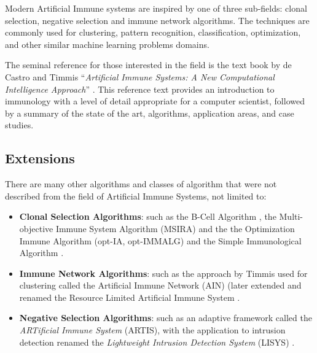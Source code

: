 \begin{bibunit}
Modern Artificial Immune systems are inspired by one of three sub-fields: clonal selection, negative selection and immune network algorithms. The techniques are commonly used for clustering, pattern recognition, classification, optimization, and other similar machine learning problems domains.

The seminal reference for those interested in the field is the text book by de Castro and Timmis ``\emph{Artificial Immune Systems: A New Computational Intelligence Approach}'' \cite{Castro2002}. This reference text provides an introduction to immunology with a level of detail appropriate for a computer scientist, followed by a summary of the state of the art, algorithms, application areas, and case studies.

% 
% 
\subsection{Extensions}
There are many other algorithms and classes of algorithm that were not described from the field of Artificial Immune Systems, not limited to:

\begin{itemize}
	\item \textbf{Clonal Selection Algorithms}: such as the B-Cell Algorithm \cite{Kelsey2003}, the Multi-objective Immune System Algorithm (MSIRA) \cite{Coello2002, Cortes2003} and the the Optimization Immune Algorithm (opt-IA, opt-IMMALG) \cite{Cutello2002a, Cutello2002} and the Simple Immunological Algorithm \cite{Cutello2005b}.
	\item \textbf{Immune Network Algorithms}: such as the approach by Timmis used for clustering called the Artificial Immune Network (AIN) \cite{Timmis2000}  (later extended and renamed the Resource Limited Artificial Immune System \cite{Timmis2001, Timmis2000a}.
	\item \textbf{Negative Selection Algorithms}: such as an adaptive framework called the \emph{ARTificial Immune System} (ARTIS), with the application to intrusion detection renamed the \emph{Lightweight Intrusion Detection System} (LISYS) \cite{Hofmeyr1999, Hofmeyr2000}.
\end{itemize}


\putbib
\end{bibunit}

